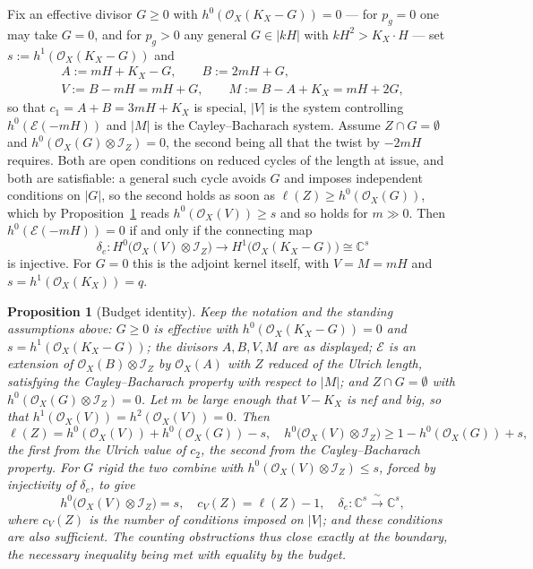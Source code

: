 \documentclass{amsart}
\newtheorem{proposition}[theorem]{Proposition}
\theoremstyle{definition}
\newcommand{\OO}{\mathcal{O}}
\newcommand{\EE}{\mathcal{E}}
\newcommand{\II}{\mathcal{I}}
\newcommand{\CC}{\mathbb{C}}
\newcommand{\len}{\ell}
\begin{document}
Fix an effective divisor $G\ge0$ with $h^0(\OO_X(K_X-G))=0$ --- for $p_g=0$ one may take $G=0$, and for $p_g>0$ any general $G\in|kH|$ with $kH^2>K_X\cdot H$ --- set $s:=h^1(\OO_X(K_X-G))$ and
\begin{gather*}
A:=mH+K_X-G,\qquad B:=2mH+G,\\
V:=B-mH=mH+G,\qquad M:=B-A+K_X=mH+2G ,
\end{gather*}
so that $c_1=A+B=3mH+K_X$ is special, $|V|$ is the system controlling $h^0(\EE(-mH))$ and $|M|$ is the Cayley--Bacharach system. Assume $Z\cap G=\emptyset$ and $h^0(\OO_X(G)\otimes\II_Z)=0$, the second being all that the twist by $-2mH$ requires. Both are open conditions on reduced cycles of the length at issue, and both are satisfiable: a general such cycle avoids $G$ and imposes independent conditions on $|G|$, so the second holds as soon as $\len(Z)\ge h^0(\OO_X(G))$, which by Proposition~\ref{prop:budget} reads $h^0(\OO_X(V))\ge s$ and so holds for $m\gg0$. Then $h^0(\EE(-mH))=0$ if and only if the connecting map
\[
\delta_e:H^0\bigl(\OO_X(V)\otimes\II_Z\bigr)\longrightarrow H^1\bigl(\OO_X(K_X-G)\bigr)\cong\CC^{s}
\]
is injective. For $G=0$ this is the adjoint kernel itself, with $V=M=mH$ and $s=h^1(\OO_X(K_X))=q$.

\begin{proposition}[Budget identity]\label{prop:budget}
Keep the notation and the standing assumptions above: $G\ge0$ is effective with $h^0(\OO_X(K_X-G))=0$ and $s=h^1(\OO_X(K_X-G))$; the divisors $A,B,V,M$ are as displayed; $\EE$ is an extension of $\OO_X(B)\otimes\II_Z$ by $\OO_X(A)$ with $Z$ reduced of the Ulrich length, satisfying the Cayley--Bacharach property with respect to $|M|$; and $Z\cap G=\emptyset$ with $h^0(\OO_X(G)\otimes\II_Z)=0$. Let $m$ be large enough that $V-K_X$ is nef and big, so that
$h^1(\OO_X(V))=h^2(\OO_X(V))=0$. Then
\[
\len(Z)=h^0(\OO_X(V))+h^0(\OO_X(G))-s ,\quad
h^0\bigl(\OO_X(V)\otimes\II_Z\bigr)\ge 1-h^0(\OO_X(G))+s,
\]
the first from the Ulrich value of $c_2$, the second from the Cayley--Bacharach property. For $G$ rigid the two combine with $h^0(\OO_X(V)\otimes\II_Z)\le s$, forced by injectivity of $\delta_e$, to give
\[
h^0\bigl(\OO_X(V)\otimes\II_Z\bigr)=s,\quad c_V(Z)=\len(Z)-1,\quad
\delta_e:\CC^{s}\xrightarrow{\ \sim\ }\CC^{s},
\]
where $c_V(Z)$ is the number of conditions imposed on $|V|$; and these conditions are also sufficient. The counting obstructions thus close \emph{exactly at the boundary}, the necessary inequality being met with equality by the budget.
\end{proposition}
\end{document}
